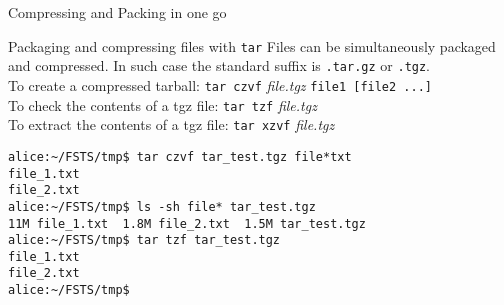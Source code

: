 \begin{frame}[t,fragile]{Compressing and Packing in one go}

  \vspace{-0.3cm}
  \begin{block}{Packaging and compressing files with \alert{\texttt{tar}}}
{\footnotesize
    Files can be simultaneously packaged and compressed. In
  such case the standard suffix is \alert{\texttt{.tar.gz}} or
  \alert{\texttt{.tgz}}. \\
To create a compressed tarball: \texttt{\alert{tar czvf}} \emph{file.tgz} \texttt{file1 [file2 ...]} \\
To check
  the contents of a tgz file: \texttt{\alert{tar tzf}}
  \emph{file.tgz}\\
To extract
  the contents of a tgz file: \texttt{\alert{tar xzvf}}
  \emph{file.tgz}
}
  
\vspace{0.2cm}
{\footnotesize
        \begin{lstlisting}
alice:~/FSTS/tmp$ tar czvf tar_test.tgz file*txt 
file_1.txt
file_2.txt
alice:~/FSTS/tmp$ ls -sh file* tar_test.tgz 
11M file_1.txt  1.8M file_2.txt  1.5M tar_test.tgz
alice:~/FSTS/tmp$ tar tzf tar_test.tgz 
file_1.txt
file_2.txt
alice:~/FSTS/tmp$

        \end{lstlisting}

}
  \end{block}
  
\end{frame}

